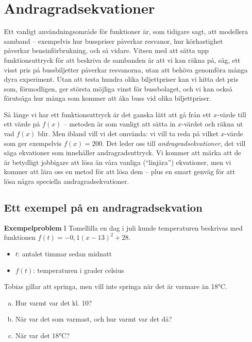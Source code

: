 \section{Andragradsekvationer}

Ett vanligt användningsområde för funktioner är, som tidigare sagt, att modellera samband -- exempelvis hur busspriser påverkar resvanor, hur körhastighet påverkar bensinförbrukning, och så vidare.
Vitsen med att sätta upp funktionsuttryck för att beskriva de sambanden är att vi kan räkna på, säg, ett visst pris på bussbiljetter påverkar resvanorna, utan att behöva genomföra många dyra experiment.
Utan att testa hundra olika biljettpriser kan vi hitta det pris som, förmodligen, ger största möjliga vinst för bussbolaget, och vi kan också förutsäga hur många som kommer att åka buss vid olika biljettpriser.

Så länge vi har ett funktionsuttryck är det ganska lätt att gå från ett $x$-värde till ett värde på $f(x)$ -- metoden är som vanligt att sätta in $x$-värdet och räkna ut vad $f(x)$ blir.
Men ibland vill vi det omvända: vi vill ta reda på vilket $x$-värde som ger exempelvis $f(x)=200$.
Det leder oss till \emph{andragradsekvationer}, det vill säga ekvationer som innehåller andragradsuttryck.
Vi kommer att märka att de är betydligt jobbigare att lösa än våra vanliga (``linjära'') ekvationer, men vi kommer att lära oss en metod för att lösa dem -- plus en smart genväg för att lösa några speciella andragradsekvationer.

\subsection{Ett exempel på en andragradsekvation}

\textbf{Exempelproblem}
I Tomellilla en dag i juli kunde temperaturen beskrivas med funktionen $f(t) = -0,1(x-13)^2+28$.
\begin{itemize}
  \item $t$: antalet timmar sedan midnatt
  \item $f(t)$: temperaturen i grader celsius
\end{itemize}

Tobias gillar att springa, men vill inte springa när det är varmare än 18°C.

\begin{enumerate}[(a)]
  \item Hur varmt var det kl. 10?
  \item När var det som varmast, och hur varmt var det då?
  \item När var det 18°C?
\end{enumerate}

